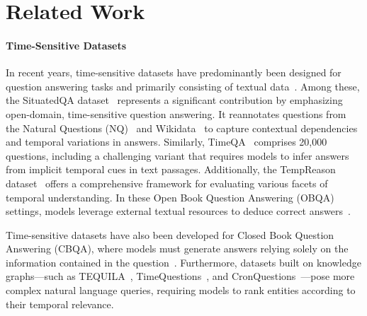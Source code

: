 \section{Related Work}

\paragraph{Time-Sensitive Datasets}
In recent years, time-sensitive datasets have predominantly been designed for question answering tasks and primarily consisting of textual data~\cite{zhang2021situatedqa,chen2021dataset,tan2023towards,liska2022streamingqa,wei2023menatqa,yang2024continual}. Among these, the SituatedQA dataset~\cite{zhang2021situatedqa} represents a significant contribution by emphasizing open-domain, time-sensitive question answering. It reannotates questions from the Natural Questions (NQ)~\cite{kwiatkowski2019natural} and Wikidata~\cite{vrandevcic2014wikidata} to capture contextual dependencies and temporal variations in answers. Similarly, TimeQA~\cite{chen2021dataset} comprises 20,000 questions, including a challenging variant that requires models to infer answers from implicit temporal cues in text passages. Additionally, the TempReason dataset~\cite{tan2023towards} offers a comprehensive framework for evaluating various facets of temporal understanding. In these Open Book Question Answering (OBQA) settings, models leverage external textual resources to deduce correct answers~\cite{izacard2020leveraging,zaheer2020big,wei2021finetuned,ouyang2022training,yang2024enhancing}.

Time-sensitive datasets have also been developed for Closed Book Question Answering (CBQA), where models must generate answers relying solely on the information contained in the question~\cite{fevry2020entities,roberts2020much,dhingra2022time}. Furthermore, datasets built on knowledge graphs—such as TEQUILA~\cite{jia2018tequila}, TimeQuestions~\cite{jia2021complex}, and CronQuestions~\cite{saxena2021question}—pose more complex natural language queries, requiring models to rank entities according to their temporal relevance.

